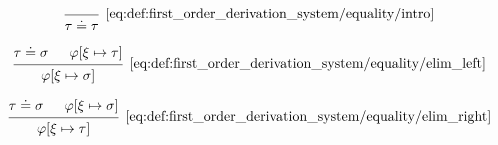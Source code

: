 \begin{definition}
\begin{thmenum}
    \begin{minipage}{0.3\textwidth}
      \begin{equation*}\taglabel[\textrm{R} \( \doteq^+ \)]{eq:def:first_order_derivation_system/equality/intro}
        \begin{prooftree}
          \infer0[\ref{eq:def:first_order_derivation_system/equality/intro}]{ \tau \doteq \tau }
        \end{prooftree}
      \end{equation*}
    \end{minipage}
    \hfill
    \begin{minipage}{0.3\textwidth}
      \begin{equation*}\taglabel[\textrm{R} \( \doteq_L^- \)]{eq:def:first_order_derivation_system/equality/elim_left}
        \begin{prooftree}
          \hypo{ \tau \doteq \sigma }
          \hypo{ \varphi[\xi \mapsto \tau] }
          \infer2[\ref{eq:def:first_order_derivation_system/equality/elim_left}]{ \varphi[\xi \mapsto \sigma] }
        \end{prooftree}
      \end{equation*}
    \end{minipage}
    \hfill
    \begin{minipage}{0.3\textwidth}
      \begin{equation*}\taglabel[\textrm{R} \( \doteq_L^+ \)]{eq:def:first_order_derivation_system/equality/elim_right}
        \begin{prooftree}
          \hypo{ \tau \doteq \sigma }
          \hypo{ \varphi[\xi \mapsto \sigma] }
          \infer2[\ref{eq:def:first_order_derivation_system/equality/elim_right}]{ \varphi[\xi \mapsto \tau] }
        \end{prooftree}
      \end{equation*}
    \end{minipage}
  \end{thmenum}
\end{definition}

